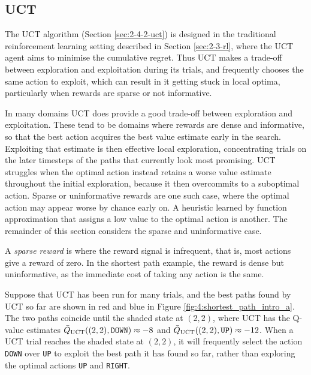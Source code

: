 \subsection{UCT}

    The UCT algorithm (Section \ref{sec:2-4-2-uct}) is designed in the traditional reinforcement learning setting described in Section \ref{sec:2-3-rl}, where the UCT agent aims to minimise the cumulative regret. Thus UCT makes a trade-off between exploration and exploitation during its trials, and frequently chooses the same action to exploit, which can result in it getting stuck in local optima, particularly when rewards are sparse or not informative. 

    In many domains UCT does provide a good trade-off between exploration and exploitation. These tend to be domains where rewards are dense and informative, so that the best action acquires the best value estimate early in the search. Exploiting that estimate is then effective local exploration, concentrating trials on the later timesteps of the paths that currently look most promising. UCT struggles when the optimal action instead retains a worse value estimate throughout the initial exploration, because it then overcommits to a suboptimal action. Sparse or uninformative rewards are one such case, where the optimal action may appear worse by chance early on. A heuristic learned by function approximation that assigns a low value to the optimal action is another. The remainder of this section considers the sparse and uninformative case.

    A \textit{sparse reward} is where the reward signal is infrequent, that is, most actions give a reward of zero. In the shortest path example, the reward is dense but uninformative, as the immediate cost of taking any action is the same. 

    Suppose that UCT has been run for many trials, and the best paths found by UCT so far are shown in red and blue in Figure \ref{fig:4:shortest_path_intro_a}. The two paths coincide until the shaded state at $(2,2)$, where UCT has the Q-value estimates ${\bar{Q}_{{\textnormal{UCT}}}}((2,2),\texttt{DOWN}) \approx -8$ and ${\bar{Q}_{{\textnormal{UCT}}}}((2,2),\texttt{UP}) \approx -12$. When a UCT trial reaches the shaded state at $(2,2)$, it will frequently select the action \texttt{DOWN} over \texttt{UP} to exploit the best path it has found so far, rather than exploring the optimal actions \texttt{UP} and \texttt{RIGHT}.

